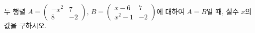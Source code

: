 두 행렬 $A=\begin{pmatrix} -x^2 & 7 \\ 8 & -2 \end{pmatrix}$, $B=\begin{pmatrix} x-6 & 7 \\ x^2-1 & -2 \end{pmatrix}$에 대하여 $A=B$일 때, 실수 $x$의 값을 구하시오.

